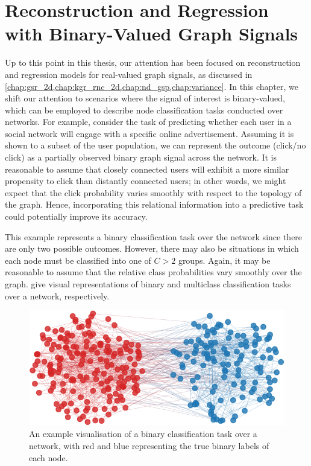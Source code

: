 \chapter{Reconstruction and Regression with Binary-Valued Graph Signals} %

\label{chap:binary} 


Up to this point in this thesis, our attention has been focused on reconstruction and regression models for real-valued graph signals, as discussed in \cref{chap:gsr_2d,chap:kgr_rnc_2d,chap:nd_gsp,chap:variance}. In this chapter, we shift our attention to scenarios where the signal of interest is binary-valued, which can be employed to describe node classification tasks conducted over networks. For example, consider the task of predicting whether each user in a social network will engage with a specific online advertisement. Assuming it is shown to a subset of the user population, we can represent the outcome (click/no click) as a partially observed binary graph signal across the network. It is reasonable to assume that closely connected users will exhibit a more similar propensity to click than distantly connected users; in other words, we might expect that the click probability varies smoothly with respect to the topology of the graph. Hence, incorporating this relational information into a predictive task could potentially improve its accuracy.

This example represents a binary classification task over the network since there are only two possible outcomes. However, there may also be situations in which each node must be classified into one of $C > 2$ groups. Again, it may be reasonable to assume that the relative class probabilities vary smoothly over the graph.  give visual representations of binary and multiclass classification tasks over a network, respectively.


\begin{figure}[t] 
    \begin{center}
        \includegraphics[width=0.7\linewidth]{Figures/2class_graph.pdf}
    \end{center}
   \caption[Visualisation of a binary classification task over a network]{An example visualisation of a binary classification task over a network, with red and blue representing the true binary labels of each node.} 
    \label{fig:binary_class_graph}
\end{figure} 

